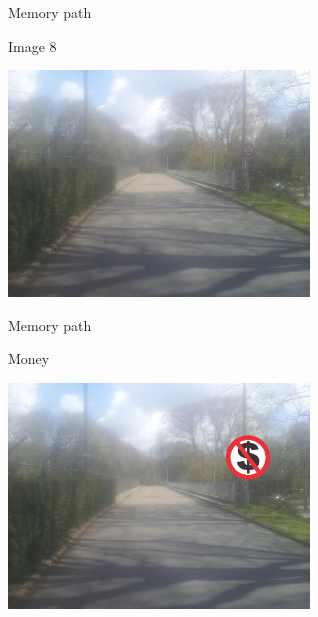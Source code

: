 \begin{frame}{Memory path}
  \begin{block}{Image 8}
    \begin{center}
      \includegraphics[height=6cm]{img/loci/08.jpg}
    \end{center}
  \end{block}
\end{frame}
\begin{frame}{Memory path}
  \begin{block}{Money}
    \begin{center}
      \includegraphics[height=6cm]{img/loci/08-money.jpg}
    \end{center}
  \end{block}
\end{frame}

